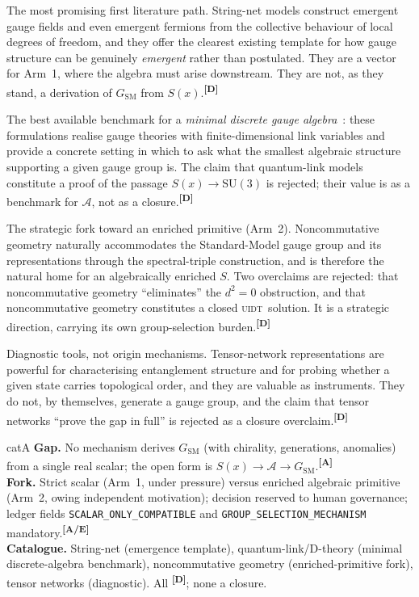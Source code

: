 \documentclass[12pt,a4paper,twoside]{article}
\theoremstyle{plain}
\theoremstyle{definition}
\theoremstyle{remark}
\newcommand{\UIDT}{\textsc{uidt}}
\newcommand{\catmark}[1]{\textsuperscript{\textsf{\textbf{[#1]}}}}
\begin{document}
\begin{description}[leftmargin=1.4em,style=nextline]
\item[String-net condensation and topological order.] The most promising first literature path. String-net models construct emergent gauge fields and even emergent fermions from the collective behaviour of local degrees of freedom, and they offer the clearest existing template for how gauge structure can be genuinely \emph{emergent} rather than postulated. They are a vector for Arm~1, where the algebra must arise downstream. They are not, as they stand, a derivation of $G_{\mathrm{SM}}$ from $S(x)$.\catmark{D} \item[Quantum-link models and D-theory.] The best available benchmark for a \emph{minimal discrete gauge algebra}~\cite{brower1999,brower2004,beard1998}: these formulations realise gauge theories with finite-dimensional link variables and provide a concrete setting in which to ask what the smallest algebraic structure supporting a given gauge group is. The claim that quantum-link models constitute a proof of the passage $S(x)\to\mathrm{SU}(3)$ is rejected; their value is as a benchmark for $\mathcal{A}$, not as a closure.\catmark{D} \item[Noncommutative geometry.] The strategic fork toward an enriched primitive (Arm~2). Noncommutative geometry naturally accommodates the Standard-Model gauge group and its representations through the spectral-triple construction, and is therefore the natural home for an algebraically enriched $S$. Two overclaims are rejected: that noncommutative geometry ``eliminates'' the $d^2=0$ obstruction, and that noncommutative geometry constitutes a closed \UIDT\ solution. It is a strategic direction, carrying its own group-selection burden.\catmark{D} \item[Tensor networks.] Diagnostic tools, not origin mechanisms. Tensor-network representations are powerful for characterising entanglement structure and for probing whether a given state carries topological order, and they are valuable as instruments. They do not, by themselves, generate a gauge group, and the claim that tensor networks ``prove the gap in full'' is rejected as a closure overclaim.\catmark{D}
\end{description}

\begin{evidencebox}{catA}
\textbf{Gap.} No mechanism derives $G_{\mathrm{SM}}$ (with chirality, generations, anomalies) from a single real scalar; the open form is
$S(x)\to\mathcal{A}\to G_{\mathrm{SM}}$.\catmark{A}\\[0.3em]
\textbf{Fork.} Strict scalar (Arm~1, under pressure) versus enriched algebraic primitive (Arm~2, owing independent motivation); decision reserved to human governance; ledger fields \texttt{SCALAR\_ONLY\_COMPATIBLE} and
\texttt{GROUP\_SELECTION\_MECHANISM} mandatory.\catmark{A/E}\\[0.3em]
\textbf{Catalogue.} String-net (emergence template), quantum-link/D-theory (minimal discrete-algebra benchmark), noncommutative geometry (enriched-primitive fork), tensor networks (diagnostic). All \catmark{D}; none a closure.
\end{evidencebox}
\end{document}
